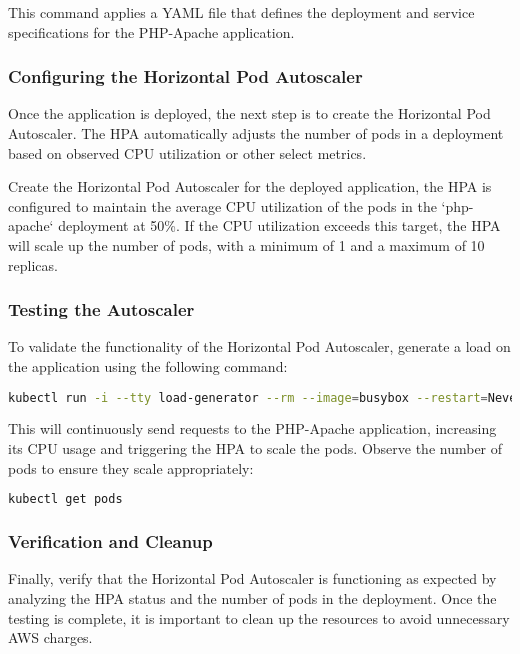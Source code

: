 This command applies a YAML file that defines the deployment and service specifications for the PHP-Apache application.

\subsubsection{Configuring the Horizontal Pod Autoscaler}

Once the application is deployed, the next step is to create the Horizontal Pod Autoscaler. The HPA automatically adjusts the number of pods in a deployment based on observed CPU utilization or other select metrics.

Create the Horizontal Pod Autoscaler for the deployed application, the HPA is configured to maintain the average CPU utilization of the pods in the `php-apache` deployment at 50\%. If the CPU utilization exceeds this target, the HPA will scale up the number of pods, with a minimum of 1 and a maximum of 10 replicas.

\subsubsection{Testing the Autoscaler}

To validate the functionality of the Horizontal Pod Autoscaler, generate a load on the application using the following command:

\begin{lstlisting}[language=bash, label={lst:autoscaler-test}, caption={Autoscaler test}]
kubectl run -i --tty load-generator --rm --image=busybox --restart=Never -- /bin/sh -c "while sleep 0.01; do wget -q -O- http://php-apache; done"
\end{lstlisting}

This will continuously send requests to the PHP-Apache application, increasing its CPU usage and triggering the HPA to scale the pods. Observe the number of pods to ensure they scale appropriately:

\begin{lstlisting}[language=bash, label={lst:pods-number}, caption={Get the number of pods}]
kubectl get pods
\end{lstlisting}

\subsubsection{Verification and Cleanup}

Finally, verify that the Horizontal Pod Autoscaler is functioning as expected by analyzing the HPA status and the number of pods in the deployment. Once the testing is complete, it is important to clean up the resources to avoid unnecessary AWS charges.
